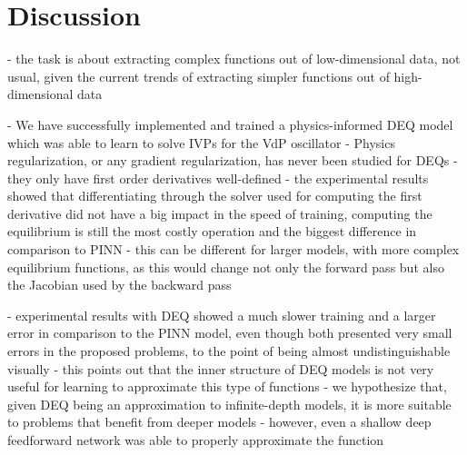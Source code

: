 \chapter{Discussion}\label{ch:conclusion}

- the task is about extracting complex functions out of low-dimensional data, not usual, given the current trends of extracting simpler functions out of high-dimensional data

- We have successfully implemented and trained a physics-informed DEQ model which was able to learn to solve IVPs for the VdP oscillator
- Physics regularization, or any gradient regularization, has never been studied for DEQs
    - they only have first order derivatives well-defined
- the experimental results showed that differentiating through the solver used for computing the first derivative did not have a big impact in the speed of training, computing the equilibrium is still the most costly operation and the biggest difference in comparison to PINN
    - this can be different for larger models, with more complex equilibrium functions, as this would change not only the forward pass but also the Jacobian used by the backward pass

- experimental results with DEQ showed a much slower training and a larger error in comparison to the PINN model, even though both presented very small errors in the proposed problems, to the point of being almost undistinguishable visually
- this points out that the inner structure of DEQ models is not very useful for learning to approximate this type of functions
- we hypothesize that, given DEQ being an approximation to infinite-depth models, it is more suitable to problems that benefit from deeper models
    - however, even a shallow deep feedforward network was able to properly approximate the function


